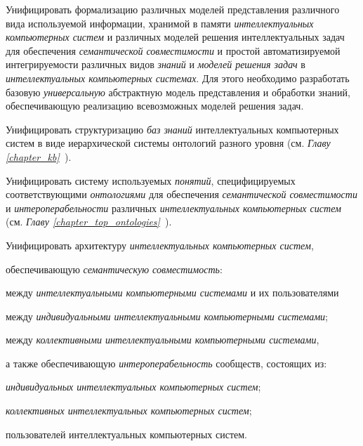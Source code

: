 \begin{textitemize}
	\item  
	Унифицировать формализацию различных моделей представления различного вида используемой информации, хранимой в памяти \textit{интеллектуальных компьютерных систем} и различных моделей решения интеллектуальных задач для обеспечения \textit{семантической совместимости} и простой автоматизируемой интегрируемости различных видов \textit{знаний} и \textit{моделей решения задач} в \textit{интеллектуальных компьютерных системах}. Для этого необходимо разработать базовую \textit{универсальную} абстрактную модель представления и обработки знаний, обеспечивающую реализацию всевозможных моделей решения задач.
	\item  
	Унифицировать структуризацию \textit{баз знаний} интеллектуальных компьютерных систем в виде иерархической системы онтологий разного уровня (см. \textit{Главу \ref{chapter_kb}~}).
	\item  
	Унифицировать систему используемых \textit{понятий}, специфицируемых соответствующими \textit{онтологиями} для обеспечения \textit{семантической совместимости} и \textit{интероперабельности} различных \textit{интеллектуальных компьютерных систем} (см. \textit{Главу \ref{chapter_top_ontologies}~}).
	\item  
	Унифицировать архитектуру \textit{интеллектуальных компьютерных систем}, 
	\begin{textitemize}
		\item обеспечивающую \textit{семантическую совместимость}:
		\begin{textitemize}
			\item между \textit{интеллектуальными компьютерными системами} и их пользователями
			\item между \textit{индивидуальными интеллектуальными компьютерными системами};
			\item между \textit{коллективными интеллектуальными компьютерными системами},
		\end{textitemize}
		\item а также обеспечивающую \textit{интероперабельность} сообществ, состоящих из:
		\begin{textitemize}
			\item \textit{индивидуальных интеллектуальных компьютерных систем};
			\item \textit{коллективных интеллектуальных компьютерных систем};
			\item пользователей интеллектуальных компьютерных систем.

\end{textitemize}
\end{textitemize}
\end{textitemize}
